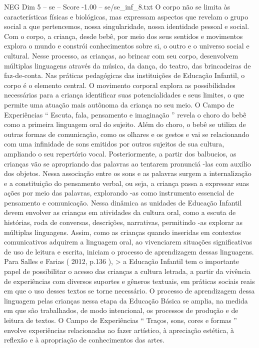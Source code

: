 \begin{textsample}{NEG Dim 5 – se – Score -1.00 – se/se\_inf\_8.txt}
O corpo não se limita às características físicas e biológicas, mas expressam aspectos que revelam o grupo social a que pertencemos, nossa singularidade, nossa identidade pessoal e social.
Com o corpo, a criança, desde bebê, por meio dos seus sentidos e movimentos explora o mundo e constrói conhecimentos sobre si, o outro e o universo social e cultural.
Nesse processo, as crianças, ao brincar com seu corpo, desenvolvem múltiplas linguagens através da música, da dança, do teatro, das brincadeiras de faz-de-conta.
Nas práticas pedagógicas das instituições de Educação Infantil, o corpo é o elemento central.
O movimento corporal explora as possibilidades necessárias para a criança identificar suas potencialidades e seus limites, o que permite uma atuação mais autônoma da criança no seu meio.
O Campo de Experiências “ Escuta, fala, pensamento e imaginação ” revela o choro do bebê como a primeira linguagem oral do sujeito.
Além do choro, o bebê se utiliza de outras formas de comunicação, como os olhares e os gestos e vai se relacionando com uma infinidade de sons emitidos por outros sujeitos de sua cultura, ampliando o seu repertório vocal.
Posteriormente, a partir dos balbucios, as crianças vão se apropriando das palavras ao tentarem pronunciá -las com auxílio dos objetos.
Nessa associação entre os sons e as palavras surgem a internalização e a constituição do pensamento verbal, ou seja, a criança passa a expressar suas ações por meio das palavras, explorando -as como instrumento essencial de pensamento e comunicação.
Nessa dinâmica as unidades de Educação Infantil devem envolver as crianças em atividades da cultura oral, como a escuta de histórias, roda de conversas, descrições, narrativas, permitindo -as explorar as múltiplas linguagens.
Assim, como as crianças quando inseridas em contextos comunicativos adquirem a linguagem oral, ao vivenciarem situações significativas de uso de leitura e escrita, iniciam o processo de aprendizagem dessas linguagens.
Para Salles e Farias ( 2012, p.136 ), > a Educação Infantil tem o importante papel de possibilitar o acesso das crianças a cultura letrada, a partir da vivência de experiências com diversos suportes e gêneros textuais, em práticas sociais reais em que o uso desses textos se torne necessário.
O processo de aprendizagem dessa linguagem pelas crianças nessa etapa da Educação Básica se amplia, na medida em que são trabalhados, de modo intencional, os processos de produção e de leitura de textos.
O Campo de Experiências “ Traços, sons, cores e formas ” envolve experiências relacionadas ao fazer artístico, à apreciação estética, à reflexão e à apropriação de conhecimentos das artes.

\end{textsample}
